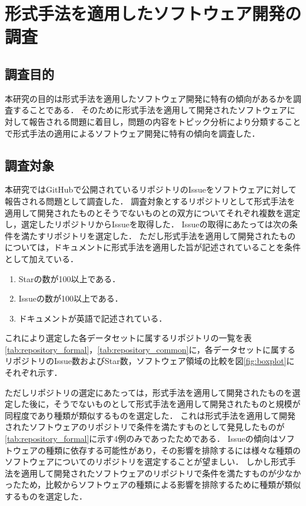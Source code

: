\documentclass[main]{subfiles}
\begin{document}
\chapter{形式手法を適用したソフトウェア開発の調査}

\section{調査目的}

本研究の目的は形式手法を適用したソフトウェア開発に特有の傾向があるかを調査することである．
そのために形式手法を適用して開発されたソフトウェアに対して報告される問題に着目し，問題の内容をトピック分析により分類することで形式手法の適用によるソフトウェア開発に特有の傾向を調査した．

\section{調査対象}
\label{sec:survey-target}

本研究ではGitHubで公開されているリポジトリのIssueをソフトウェアに対して報告される問題として調査した．
調査対象とするリポジトリとして形式手法を適用して開発されたものとそうでないものとの双方についてそれぞれ複数を選定し，選定したリポジトリからIssueを取得した．
Issueの取得にあたっては次の条件を満たすリポジトリを選定した．
ただし形式手法を適用して開発されたものについては，ドキュメントに形式手法を適用した旨が記述されていることを条件として加えている．

\begin{enumerate}
	\item Starの数が100以上である．
	\item Issueの数が100以上である．
	\item ドキュメントが英語で記述されている．
\end{enumerate}

これにより選定した各データセットに属するリポジトリの一覧を表\ref{tab:repository_formal}，\ref{tab:repository_common}に，各データセットに属するリポジトリのIssue数およびStar数，ソフトウェア領域の比較を図\ref{fig:boxplot}にそれぞれ示す．



ただしリポジトリの選定にあたっては，形式手法を適用して開発されたものを選定した後に，そうでないものとして形式手法を適用して開発されたものと規模が同程度であり種類が類似するものを選定した．
これは形式手法を適用して開発されたソフトウェアのリポジトリで条件を満たすものとして発見したものが\ref{tab:repository_formal}に示す4例のみであったためである．
Issueの傾向はソフトウェアの種類に依存する可能性があり，その影響を排除するには様々な種類のソフトウェアについてのリポジトリを選定することが望ましい．
しかし形式手法を適用して開発されたソフトウェアのリポジトリで条件を満たすものが少なかったため，比較からソフトウェアの種類による影響を排除するために種類が類似するものを選定した．
\end{document}
